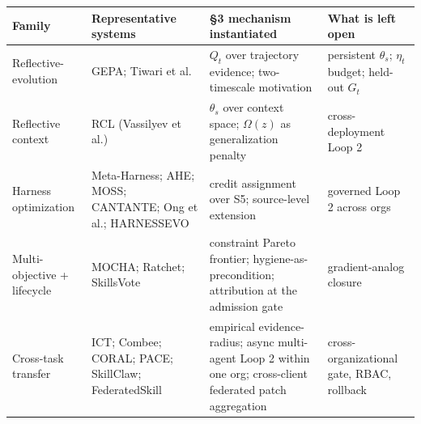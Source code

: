 \documentclass[
]{article}
\newcounter{none} %
\begin{document}
{\def\LTcaptype{none} %
\begin{longtable}[]{@{}
  >{\raggedright\arraybackslash}p{}
  >{\raggedright\arraybackslash}p{}
  >{\raggedright\arraybackslash}p{}
  >{\raggedright\arraybackslash}p{}@{}}
\toprule\noalign{}
\begin{minipage}[b]{\linewidth}\raggedright
Family
\end{minipage} & \begin{minipage}[b]{\linewidth}\raggedright
Representative systems
\end{minipage} & \begin{minipage}[b]{\linewidth}\raggedright
§3 mechanism instantiated
\end{minipage} & \begin{minipage}[b]{\linewidth}\raggedright
What is left open
\end{minipage} \\
\midrule\noalign{}
\endhead
\bottomrule\noalign{}
\endlastfoot
Reflective-evolution & GEPA; Tiwari et al. & \(Q_t\) over trajectory
evidence; two-timescale motivation & persistent \(\theta_s\); \(\eta_t\)
budget; held-out \(G_t\) \\
Reflective context & RCL (Vassilyev et al.) & \(\theta_s\) over context
space; \(\Omega(z)\) as generalization penalty & cross-deployment Loop
2 \\
Harness optimization & Meta-Harness; AHE; MOSS; CANTANTE; Ong et al.;
HARNESSEVO & credit assignment over S5; source-level extension &
governed Loop 2 across orgs \\
Multi-objective + lifecycle & MOCHA; Ratchet; SkillsVote & constraint
Pareto frontier; hygiene-as-precondition; attribution at the admission
gate & gradient-analog closure \\
Cross-task transfer & ICT; Combee; CORAL; PACE; SkillClaw;
FederatedSkill & empirical evidence-radius; async multi-agent Loop 2
within one org; cross-client federated patch aggregation &
cross-organizational gate, RBAC, rollback \\
\end{longtable}
}
\end{document}
